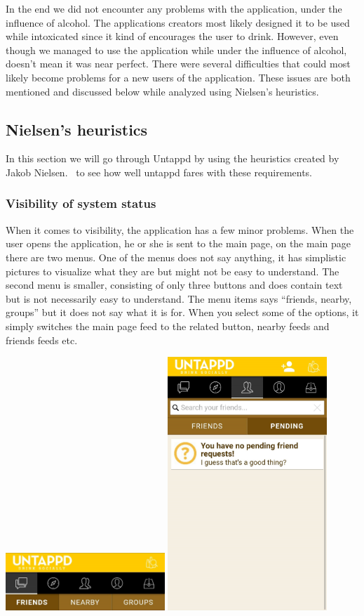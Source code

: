 \documentclass[12pt]{article}
\begin{document}
In the end we did not encounter any problems with the application, under the
influence of alcohol. The applications creators most likely designed it to be
used while intoxicated since it kind of encourages the user to drink. However,
even though we managed to use the application while under the influence of
alcohol, doesn't mean it was near perfect. There were several difficulties that
could most likely become problems for a new users of the application. These
issues are both mentioned and discussed below while analyzed using Nielsen’s
heuristics.


\subsection{Nielsen’s heuristics}

In this section we will go through Untappd by using the heuristics created by
Jakob Nielsen.~\cite{usability} to see how well untappd fares with these
requirements.

\subsubsection{Visibility of system status}
When it comes to visibility, the application has a few minor problems. When the user
opens the application, he or she is sent to the main page, on the main page
there are two menus. One of the menus does not say anything, it has simplistic
pictures to visualize what they are but might not be easy to understand. The
second menu is smaller, consisting of only three buttons and does  contain text
but is not necessarily easy to understand. The menu items says “friends, nearby,
groups” but it does not say what it is for. When you select some of the options,
it simply switches the main page feed to the related button, nearby feeds and
friends feeds etc. 

\includegraphics[width=6cm]{pictures/app/manus}
\break
\break
\includegraphics[width=6cm]{pictures/app/pendingfriends}
\end{document}
